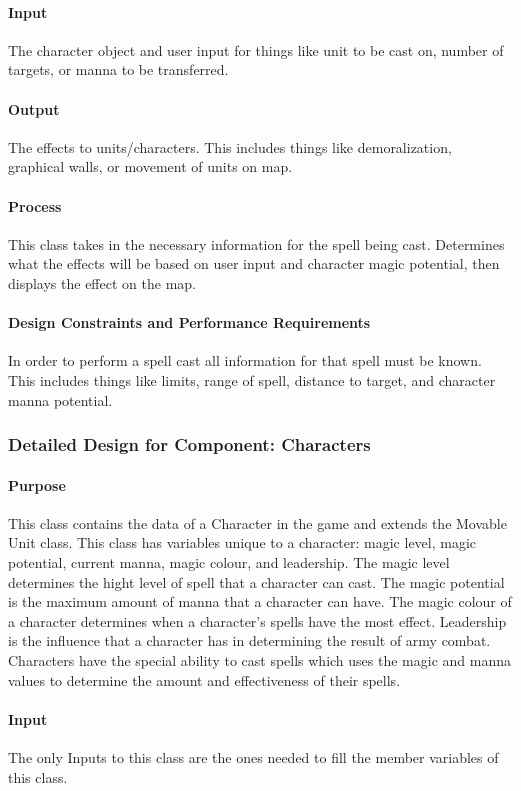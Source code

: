 \documentclass[12pt,a4paper,titlepage]{article}
\begin{document}
\paragraph{Input} The character object and user input for things like unit to be cast on, number of targets, or manna to be transferred.  
\paragraph{Output} The effects to units/characters.  This includes things like demoralization, graphical walls, or movement of units on map.
\paragraph{Process} This class takes in the necessary information for the spell being cast.  Determines what the effects will be based on user input and character magic potential, then displays the effect on the map.
\paragraph{Design Constraints and Performance Requirements} In order to perform a spell cast all information for that spell must be known.  This includes things like limits, range of spell, distance to target, and character manna potential.  

\subsubsection{Detailed Design for Component: Characters}
\paragraph{Purpose} This class contains the data of a Character in the game and extends the Movable Unit class. This class has variables unique to a character: magic level, magic potential, current manna, magic colour, and leadership. The magic level determines the hight level of spell that a character can cast. The magic potential is the maximum amount of manna that a character can have. The magic colour of a character determines when a character's spells have the most effect. Leadership is the influence that a character has in determining the result of army combat. Characters have the special ability to cast spells which uses the magic and manna values to determine the amount and effectiveness of their spells. 
\paragraph{Input} The only Inputs to this class are the ones needed to fill the member variables of this class.
\end{document}
